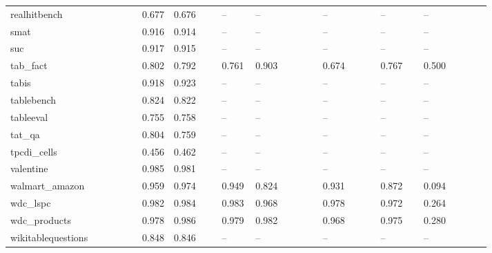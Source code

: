\begin{table}[htbp]
\begin{tabular}{p{0.121\linewidth}rp{0.108\linewidth}p{0.076\linewidth}p{0.140\linewidth}p{0.121\linewidth}p{0.095\linewidth}p{0.146\linewidth}}
realhitbench & 0.677 & 0.676 & -- & -- & -- & -- & -- \\
smat & 0.916 & 0.914 & -- & -- & -- & -- & -- \\
suc & 0.917 & 0.915 & -- & -- & -- & -- & -- \\
tab\_\allowbreak{}fact & 0.802 & 0.792 & 0.761 & 0.903 & 0.674 & 0.767 & 0.500 \\
tabis & 0.918 & 0.923 & -- & -- & -- & -- & -- \\
tablebench & 0.824 & 0.822 & -- & -- & -- & -- & -- \\
tableeval & 0.755 & 0.758 & -- & -- & -- & -- & -- \\
tat\_\allowbreak{}qa & 0.804 & 0.759 & -- & -- & -- & -- & -- \\
tpcdi\_\allowbreak{}cells & 0.456 & 0.462 & -- & -- & -- & -- & -- \\
valentine & 0.985 & 0.981 & -- & -- & -- & -- & -- \\
walmart\_\allowbreak{}amazon & 0.959 & 0.974 & 0.949 & 0.824 & 0.931 & 0.872 & 0.094 \\
wdc\_\allowbreak{}lspc & 0.982 & 0.984 & 0.983 & 0.968 & 0.978 & 0.972 & 0.264 \\
wdc\_\allowbreak{}products & 0.978 & 0.986 & 0.979 & 0.982 & 0.968 & 0.975 & 0.280 \\
wikitablequestions & 0.848 & 0.846 & -- & -- & -- & -- & -- \\
\bottomrule
\end{tabular}
\end{table}
